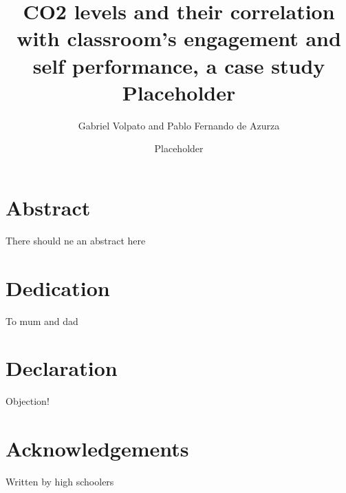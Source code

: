 \documentclass[12pt]{report}
\title{
{CO2 levels and their correlation with classroom's engagement and self performance, a case study}\\
{\large Placeholder}\\
}
\author{Gabriel Volpato and Pablo Fernando de Azurza}
\date{Placeholder}
\begin{document}
\maketitle

\chapter*{Abstract}
There should ne an abstract here

\chapter*{Dedication}
To mum and dad

\chapter*{Declaration}
Objection!

\chapter*{Acknowledgements}
Written by high schoolers

\tableofcontents
\end{document}
